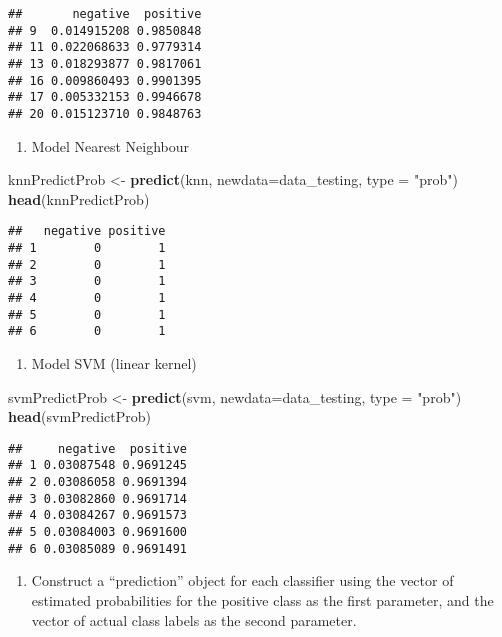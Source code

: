 \documentclass[]{article}
\newenvironment{Shaded}{\begin{snugshade}}{\end{snugshade}}
\newcommand{\DataTypeTok}[1]{\textcolor[rgb]{0.13,0.29,0.53}{#1}}
\newcommand{\KeywordTok}[1]{\textcolor[rgb]{0.13,0.29,0.53}{\textbf{#1}}}
\newcommand{\NormalTok}[1]{#1}
\newcommand{\StringTok}[1]{\textcolor[rgb]{0.31,0.60,0.02}{#1}}
\providecommand{\tightlist}{%
  \setlength{\itemsep}{0pt}\setlength{\parskip}{0pt}}
\begin{document}
\begin{verbatim}
##       negative  positive
## 9  0.014915208 0.9850848
## 11 0.022068633 0.9779314
## 13 0.018293877 0.9817061
## 16 0.009860493 0.9901395
## 17 0.005332153 0.9946678
## 20 0.015123710 0.9848763
\end{verbatim}

\begin{enumerate}
\def\labelenumi{\arabic{enumi}.}
\setcounter{enumi}{3}
\tightlist
\item
  Model Nearest Neighbour
\end{enumerate}

\begin{Shaded}
\begin{Highlighting}[]
\NormalTok{knnPredictProb <-}\StringTok{ }\KeywordTok{predict}\NormalTok{(knn, }\DataTypeTok{newdata=}\NormalTok{data_testing, }\DataTypeTok{type =} \StringTok{"prob"}\NormalTok{)}
\KeywordTok{head}\NormalTok{(knnPredictProb)}
\end{Highlighting}
\end{Shaded}

\begin{verbatim}
##   negative positive
## 1        0        1
## 2        0        1
## 3        0        1
## 4        0        1
## 5        0        1
## 6        0        1
\end{verbatim}

\begin{enumerate}
\def\labelenumi{\arabic{enumi}.}
\setcounter{enumi}{4}
\tightlist
\item
  Model SVM (linear kernel)
\end{enumerate}

\begin{Shaded}
\begin{Highlighting}[]
\NormalTok{svmPredictProb <-}\StringTok{ }\KeywordTok{predict}\NormalTok{(svm, }\DataTypeTok{newdata=}\NormalTok{data_testing, }\DataTypeTok{type =} \StringTok{"prob"}\NormalTok{)}
\KeywordTok{head}\NormalTok{(svmPredictProb)}
\end{Highlighting}
\end{Shaded}

\begin{verbatim}
##     negative  positive
## 1 0.03087548 0.9691245
## 2 0.03086058 0.9691394
## 3 0.03082860 0.9691714
## 4 0.03084267 0.9691573
## 5 0.03084003 0.9691600
## 6 0.03085089 0.9691491
\end{verbatim}

\begin{enumerate}
\def\labelenumi{\alph{enumi})}
\setcounter{enumi}{1}
\tightlist
\item
  Construct a ``prediction'' object for each classifier using the vector
  of estimated probabilities for the positive class as the first
  parameter, and the vector of actual class labels as the second
  parameter.
\end{enumerate}
\end{document}
